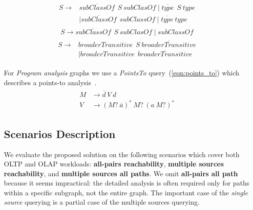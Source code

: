 \begin{align}
\begin{split}
\label{eqn:g_1}
S \to & \overline{\textit{subClassOf}} \ \ S \ \textit{subClasOf} \mid \overline{\textit{type}} \ \ S \ \textit{type}\\   & \mid \overline{\textit{subClassOf}} \ \ \textit{subClassOf} \mid \overline{\textit{type}} \ \textit{type}
\end{split}
\end{align}
\begin{align}
\label{eqn:g_2}
S \to \overline{\textit{subClassOf}} \ \ S \ \textit{subClasOf} \mid \textit{subClassOf}
\end{align}
\begin{align}
\begin{split}
\label{eqn:geo}
S \to & \textit{broaderTransitive} \ \  S \ \overline{\textit{broaderTransitive}} \\
      & \mid \textit{broaderTransitive} \ \  \overline{\textit{broaderTransitive}}
\end{split}
\end{align}

For \textit{Program analysis} graphs we use a \textit{PointsTo} query~(\ref{eqn:points_to}) which describes a points-to analysis~\cite{Zheng}. %
\begin{align}
\begin{split}
\label{eqn:points_to}
M & \to \overline{d} \ V \ d \\
V & \to (M? \ \overline{a})^* \ M? \ (a \ M?)^* 
\end{split}
\end{align}

\subsection{Scenarios Description}

We evaluate the proposed solution on the following scenarios which cover both OLTP and OLAP workloads: \textbf{all-pairs reachability}, \textbf{multiple sources reachability}, and \textbf{multiple sources all paths}. We omit \textbf{all-pairs all path} because it seems impractical: the detailed analysis is often required only for paths within a specific subgraph, not the entire graph. The important case of the \textit{single source} querying is a partial case of the multiple sources querying.

